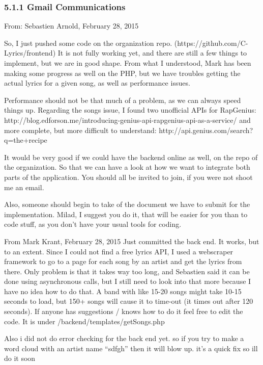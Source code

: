 \documentclass[]{article}
\begin{document}
\subsubsection{5.1.1 Gmail Communications}\label{gmail-communications}

From: Sebastien Arnold, February 28, 2015

So, I just pushed some code on the organization repo.
(https://github.com/C-Lyrics/frontend) It is not fully working yet, and
there are still a few things to implement, but we are in good shape.
From what I understood, Mark has been making some progress as well on
the PHP, but we have troubles getting the actual lyrics for a given
song, as well as performance issues.

Performance should not be that much of a problem, as we can always speed
things up. Regarding the songs issue, I found two unofficial APIs for
RapGenius:
http://blog.edforson.me/introducing-genius-api-rapgenius-api-as-a-service/
and more complete, but more difficult to understand:
http://api.genius.com/search?q=the+recipe

It would be very good if we could have the backend online as well, on
the repo of the organization. So that we can have a look at how we want
to integrate both parts of the application. You should all be invited to
join, if you were not shoot me an email.

Also, someone should begin to take of the document we have to submit for
the implementation. Milad, I suggest you do it, that will be easier for
you than to code stuff, as you don't have your usual tools for coding.

From Mark Krant, February 28, 2015 Just committed the back end. It
works, but to an extent. Since I could not find a free lyrics API, I
used a webscraper framework to go to a page for each song by an artist
and get the lyrics from there. Only problem is that it takes way too
long, and Sebastien said it can be done using asynchronous calls, but I
still need to look into that more because I have no idea how to do that.
A band with like 15-20 songs might take 10-15 seconds to load, but 150+
songs will cause it to time-out (it times out after 120 seconds). If
anyone has suggestions / knows how to do it feel free to edit the code.
It is under /backend/templates/getSongs.php

Also i did not do error checking for the back end yet. so if you try to
make a word cloud with an artist name ``sdfgh'' then it will blow up.
it's a quick fix so ill do it soon
\end{document}
